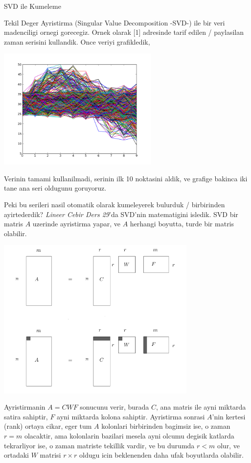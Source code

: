 \documentclass[12pt,fleqn]{article}\usepackage{../common}
\begin{document}
SVD ile Kumeleme

Tekil Deger Ayristirma (Singular Value Decomposition -SVD-) ile bir veri
madenciligi ornegi gorecegiz. Ornek olarak [1] adresinde tarif edilen /
paylasilan zaman serisini kullandik. Once veriyi grafikledik,

\includegraphics[height=6cm]{data.png}

Verinin tamami kullanilmadi, serinin ilk 10 noktasini aldik, ve grafige
bakinca iki tane ana seri oldugunu goruyoruz. 



Peki bu serileri nasil otomatik olarak kumeleyerek bulurduk / birbirinden
ayirtederdik?  {\em Lineer Cebir Ders 29}'da SVD'nin matematigini
isledik. SVD bir matris $A$ uzerinde ayristirma yapar, ve $A$ herhangi
boyutta, turde bir matris olabilir.

\includegraphics[height=8cm]{svd1.png}

Ayristirmanin $A=CWF$ sonucunu verir, burada $C$, ana matris ile ayni
miktarda satira sahiptir, $F$ ayni miktarda kolona sahiptir. Ayristirma
sonrasi $A$'nin kertesi (rank) ortaya cikar, eger tum $A$ kolonlari
birbirinden bagimsiz ise, o zaman $r=m$ olacaktir, ama kolonlarin bazilari
mesela ayni olcumu degisik katlarda tekrarliyor ise, o zaman matriste
tekillik vardir, ve bu durumda $r < m$ olur, ve ortadaki $W$ matrisi $r
\times r$ 
oldugu icin beklenenden daha ufak boyutlarda olabilir. 
\end{document}
